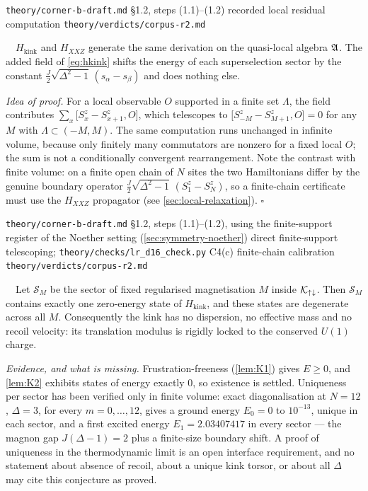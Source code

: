 %
{\texttt{theory/corner-b-draft.md} \S1.2, steps (1.1)--(1.2)}%
{recorded local residual computation}%
{\texttt{theory/verdicts/corpus-r2.md}}

\begin{lemma}
\label{lem:K3}
\statusProved\ \ $H_{\mathrm{kink}}$ and $H_{XXZ}$ generate the same derivation
on the quasi-local algebra $\mathfrak{A}$. The added field of \eqref{eq:hkink} shifts
the energy of each superselection sector by the constant
$\tfrac{J}{2}\sqrt{\Delta^2-1}\,(s_\alpha-s_\beta)$ and does nothing else.
\end{lemma}

\noindent\emph{Idea of proof.} For a local observable $O$ supported in a finite
set $\Lambda$, the field contributes
$\sum_x\bigl[S^z_x-S^z_{x+1},O\bigr]$, which telescopes to
$\bigl[S^z_{-M}-S^z_{M+1},O\bigr]=0$ for any $M$ with
$\Lambda\subset(-M,M)$. The same computation runs unchanged in infinite volume,
because only finitely many commutators are nonzero for a fixed local $O$; the
sum is not a conditionally convergent rearrangement. Note the contrast with
finite volume: on a finite open chain of $N$ sites the two Hamiltonians differ
by the genuine boundary operator
$\tfrac{J}{2}\sqrt{\Delta^2-1}\,(S^z_1-S^z_N)$, so a finite-chain certificate
must use the $H_{XXZ}$ propagator (see \cref{sec:local-relaxation}).
\hfill$\square$

%
{\texttt{theory/corner-b-draft.md} \S1.2, steps (1.1)--(1.2), using the
 finite-support register of the Noether setting (\cref{sec:symmetry-noether})}%
{direct finite-support telescoping;
 \texttt{theory/checks/lr\_d16\_check.py} C4(c) finite-chain calibration}%
{\texttt{theory/verdicts/corpus-r2.md}}

\begin{conjecture}
\label{conj:K4}
\statusConjecture\ \ Let $\mathcal S_M$ be the sector of fixed regularised
magnetisation $M$ inside $\mathcal{K}_{\uparrow\downarrow}$. Then $\mathcal S_M$
contains exactly one zero-energy state of $H_{\mathrm{kink}}$, and these states
are degenerate across all $M$. Consequently the kink has no dispersion, no
effective mass and no recoil velocity: its translation modulus is rigidly
locked to the conserved $U(1)$ charge.
\end{conjecture}

\noindent\emph{Evidence, and what is missing.} Frustration-freeness
(\cref{lem:K1}) gives $E\ge0$, and \cref{lem:K2} exhibits states of energy
exactly $0$, so existence is settled. Uniqueness per sector has been verified
only in finite volume: exact diagonalisation at $N=12$, $\Delta=3$, for every
$m=0,\dots,12$, gives a ground energy $E_0=0$ to $10^{-13}$, unique in each
sector, and a first excited energy $E_1=2.03407417$ in every sector --- the
magnon gap $J(\Delta-1)=2$ plus a finite-size boundary shift. A proof of
uniqueness in the thermodynamic limit is an open interface requirement, and no
statement about absence of recoil, about a unique kink torsor, or about all
$\Delta$ may cite this conjecture as proved.

